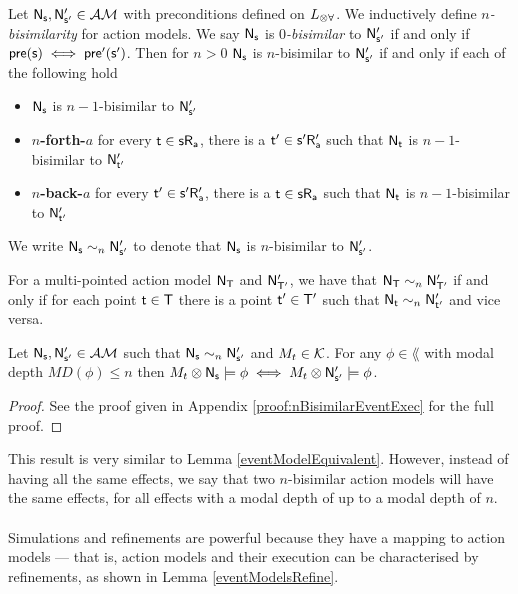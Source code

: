 \begin{defn} \label{nBisimEvent}
	Let $\mathrm{\mathsf{\mathrm{\mathsf{N}}_s, \mathrm{\mathsf{N}}'_{s'}}} \in \mathcal{AM}$ with preconditions defined on $L_{\otimes\forall}$.
	We inductively define {\em $n$-bisimilarity} for action models.
	We say $\mathrm{\mathsf{\mathrm{\mathsf{N}}_s}}$ is {\em $0$-bisimilar} to $\mathrm{\mathsf{\mathrm{\mathsf{N}}'_{s'}}}$ if and only if $\mathrm{\mathsf{pre(s) \iff
		pre'(s')}}$.
	Then for $n > 0$ $\mathrm{\mathsf{\mathrm{\mathsf{N}}_s}}$ is $n$-bisimilar to $\mathrm{\mathsf{\mathrm{\mathsf{N}}'_{s'}}}$ if and only if each of the following hold
	\begin{itemize}
		\item $\mathrm{\mathsf{\mathrm{\mathsf{N}}_s}}$ is $n-1$-bisimilar to $\mathrm{\mathsf{\mathrm{\mathsf{N}}'_{s'}}}$
		\item {\bf $n$-forth-$a$} for every $\mathrm{\mathsf{t \in s R_a}}$, there is a $\mathrm{\mathsf{t' \in s' R'_a}}$
		such that $\mathrm{\mathsf{\mathrm{\mathsf{N}}_t}}$ is
		$n-1$-bisimilar to $\mathrm{\mathsf{\mathrm{\mathsf{N}}'_{t'}}}$
		\item {\bf $n$-back-$a$} for every $\mathrm{\mathsf{t' \in s' R'_a}}$, there is a $\mathrm{\mathsf{t \in s R_a}}$ such
		that $\mathrm{\mathsf{\mathrm{\mathsf{N}}_t}}$ is
		$n-1$-bisimilar to $\mathrm{\mathsf{\mathrm{\mathsf{N}}'_{t'}}}$
	\end{itemize}
	We write $\mathrm{\mathsf{N}}_\mathrm{\mathsf{s}} \sim_n \mathrm{\mathsf{N}}'_{\mathrm{\mathsf{s}}'}$ to denote that $\mathrm{\mathsf{N}}_\mathrm{\mathsf{s}}$ is $n$-bisimilar to
	$\mathrm{\mathsf{N}}'_{\mathrm{\mathsf{s}}'}$.
\end{defn}

For a multi-pointed action model $\mathrm{\mathsf{\mathrm{\mathsf{N}}_T}}$ and $\mathrm{\mathsf{\mathrm{\mathsf{N}}'_{T'}}}$, we have that $\mathrm{\mathsf{N}}_\mathrm{\mathsf{T}} \sim_n
\mathrm{\mathsf{N}}'_{\mathrm{\mathsf{T}}'}$ if and only if for each point $\mathrm{\mathsf{t}} \in \mathrm{\mathsf{T}}$ there is a point $\mathrm{\mathsf{t}}' \in \mathrm{\mathsf{T}}'$
such that $\mathrm{\mathsf{N}}_\mathrm{\mathsf{t}} \sim_n \mathrm{\mathsf{N}}'_{\mathrm{\mathsf{t}}'}$ and vice versa.

\begin{lemma} \label{nBisimilarEventExec}
	Let $\mathrm{\mathsf{N}}_\mathrm{\mathsf{s}}, \mathrm{\mathsf{N}}'_{\mathrm{\mathsf{s}}'} \in \mathcal{AM}$ such that $\mathrm{\mathsf{N}}_\mathrm{\mathsf{s}} \sim_n \mathrm{\mathsf{N}}'_{\mathrm{\mathsf{s}}'}$ and
	$M_t \in \mathcal{K}$.
	For any $\phi \in \lang$ with modal depth $MD(\phi) \leq n$ then $M_t \otimes \mathrm{\mathsf{N}}_\mathrm{\mathsf{s}} \models \phi
	\iff M_t \otimes \mathrm{\mathsf{N}}'_{\mathrm{\mathsf{s}}'} \models \phi$.
\end{lemma}

\begin{proof}
	See the proof given in Appendix \ref{proof:nBisimilarEventExec} for the full proof.
\end{proof}

This result is very similar to Lemma \ref{eventModelEquivalent}.
However, instead of having all the same effects, we say that two $n$-bisimilar action models will
have the same effects, for all effects with a modal depth of up to a modal depth of $n$.\\
\\
Simulations and refinements are powerful because they have a mapping to action models --- that is,
action models and their execution can be characterised by refinements, as shown in Lemma
\ref{eventModelsRefine}.

